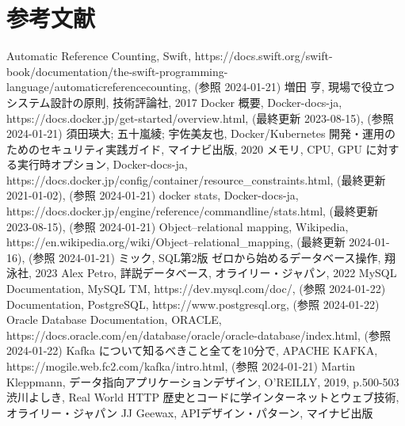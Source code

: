 \documentclass[../../main]{subfiles}
\begin{document}
    \section{参考文献}\label{sec:reference}

    \begin{thebibliography}{99}
         Automatic Reference Counting, Swift, https://docs.swift.org/swift-book/documentation/the-swift-programming-language/automaticreferencecounting, (参照 2024-01-21)
         増田 亨, 現場で役立つシステム設計の原則, 技術評論社, 2017
         Docker 概要, Docker-docs-ja, https://docs.docker.jp/get-started/overview.html, (最終更新 2023-08-15), (参照 2024-01-21)
         須田瑛大; 五十嵐綾; 宇佐美友也, Docker/Kubernetes 開発・運用のためのセキュリティ実践ガイド, マイナビ出版, 2020
         メモリ, CPU, GPU に対する実行時オプション, Docker-docs-ja, https://docs.docker.jp/config/container/resource\_constraints.html, (最終更新 2021-01-02), (参照 2024-01-21)
         docker stats, Docker-docs-ja, https://docs.docker.jp/engine/reference/commandline/stats.html, (最終更新 2023-08-15), (参照 2024-01-21)
         Object–relational mapping, Wikipedia, https://en.wikipedia.org/wiki/Object–relational\_mapping, (最終更新 2024-01-16), (参照 2024-01-21)
         ミック, SQL第2版 ゼロから始めるデータベース操作, 翔泳社, 2023
         Alex Petro, 詳説データベース, オライリー・ジャパン, 2022
         MySQL Documentation, MySQL TM, https://dev.mysql.com/doc/, (参照 2024-01-22)
         Documentation, PostgreSQL, https://www.postgresql.org, (参照 2024-01-22)
         Oracle Database Documentation, ORACLE, https://docs.oracle.com/en/database/oracle/oracle-database/index.html, (参照 2024-01-22)
         Kafka について知るべきこと全てを10分で, APACHE KAFKA, https://mogile.web.fc2.com/kafka/intro.html, (参照 2024-01-21)
         Martin Kleppmann, データ指向アプリケーションデザイン, O'REILLY, 2019, p.500-503
         渋川よしき, Real World HTTP 歴史とコードに学インターネットとウェブ技術, オライリー・ジャパン
         JJ Geewax, APIデザイン・パターン, マイナビ出版
    \end{thebibliography}

    \clearpage
\end{document}
